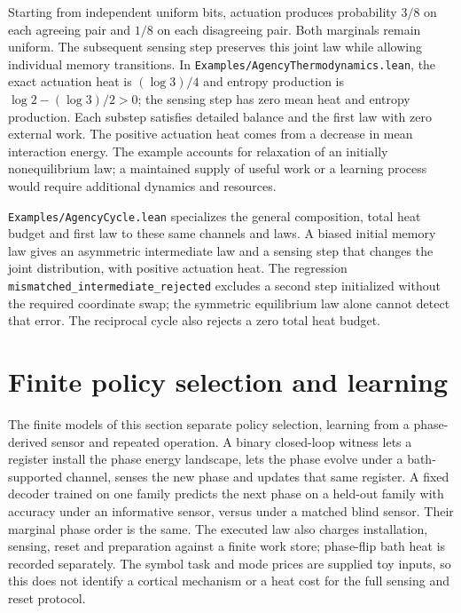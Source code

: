 \documentclass{article}
\begin{document}
Starting from independent uniform bits, actuation produces probability $3/8$ on each agreeing pair and $1/8$ on each disagreeing pair. Both marginals remain uniform. The subsequent sensing step preserves this joint law while allowing individual memory transitions. In \texttt{Examples/AgencyThermodynamics.lean}, the exact actuation heat is $(\log3)/4$ and entropy production is $\log2-(\log3)/2>0$; the sensing step has zero mean heat and entropy production. Each substep satisfies detailed balance and the first law with zero external work. The positive actuation heat comes from a decrease in mean interaction energy. The example accounts for relaxation of an initially nonequilibrium law; a maintained supply of useful work or a learning process would require additional dynamics and resources.

\texttt{Examples/AgencyCycle.lean} specializes the general composition, total
heat budget and first law to these same channels and laws. A biased initial
memory law gives an asymmetric intermediate law and a sensing step that changes
the joint distribution, with positive actuation heat. The regression
\nolinkurl{mismatched_intermediate_rejected} excludes a
second step initialized without the required coordinate swap; the symmetric
equilibrium law alone cannot detect that error. The reciprocal cycle also
rejects a zero total heat budget.

\section{Finite policy selection and learning}
\label{sec:supp-learning}

The finite models of this section separate policy selection, learning
from a phase-derived sensor and repeated operation. A binary closed-loop
witness lets a register install the phase energy landscape, lets the phase
evolve under a bath-supported channel, senses the new phase and updates that
same register. A fixed decoder trained on one family predicts the next phase
on a held-out family with accuracy \gFeedbackInformedAccuracy{} under an
informative sensor, versus \gFeedbackBlindAccuracy{} under a matched blind
sensor. Their marginal phase order is the same. The executed law also charges
installation, sensing, reset and preparation against a finite work store;
phase-flip bath heat is recorded separately. The symbol task and mode prices
are supplied toy inputs, so this does not identify a cortical mechanism or a
heat cost for the full sensing and reset protocol.
\end{document}
